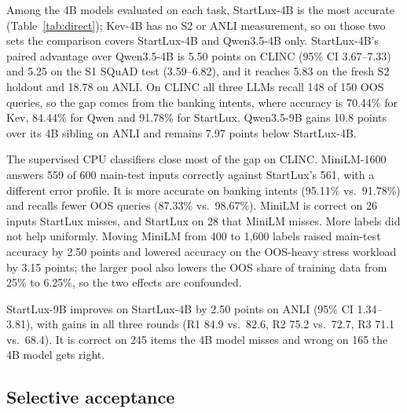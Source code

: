 \documentclass[11pt]{article}
\begin{document}
Among the 4B models evaluated on each task, StartLux-4B is the most accurate (Table~\ref{tab:direct}); Kev-4B has no S2 or ANLI measurement, so on those two sets the comparison covers StartLux-4B and Qwen3.5-4B only. StartLux-4B's paired advantage over Qwen3.5-4B is 5.50 points on CLINC (95\% CI 3.67--7.33) and 5.25 on the S1 SQuAD test (3.59--6.82), and it reaches 5.83 on the fresh S2 holdout and 18.78 on ANLI. On CLINC all three LLMs recall 148 of 150 OOS queries, so the gap comes from the banking intents, where accuracy is 70.44\% for Kev, 84.44\% for Qwen and 91.78\% for StartLux. Qwen3.5-9B gains 10.8 points over its 4B sibling on ANLI and remains 7.97 points below StartLux-4B.

The supervised CPU classifiers close most of the gap on CLINC. MiniLM-1600 answers 559 of 600 main-test inputs correctly against StartLux's 561, with a different error profile. It is more accurate on banking intents (95.11\% vs.\ 91.78\%) and recalls fewer OOS queries (87.33\% vs.\ 98.67\%). MiniLM is correct on 26 inputs StartLux misses, and StartLux on 28 that MiniLM misses. More labels did not help uniformly. Moving MiniLM from 400 to 1,600 labels raised main-test accuracy by 2.50 points and lowered accuracy on the OOS-heavy stress workload by 3.15 points; the larger pool also lowers the OOS share of training data from 25\% to 6.25\%, so the two effects are confounded.

StartLux-9B improves on StartLux-4B by 2.50 points on ANLI (95\% CI 1.34--3.81), with gains in all three rounds (R1 84.9 vs.\ 82.6, R2 75.2 vs.\ 72.7, R3 71.1 vs.\ 68.4). It is correct on 245 items the 4B model misses and wrong on 165 the 4B model gets right.

\subsection{Selective acceptance}

\begin{table}[t]
\centering
\small
\setlength{\tabcolsep}{3pt}
\caption{Primary endpoint of Study~1: test coverage (\%) and selective risk (\% error among accepted inputs) at thresholds frozen on validation with a 5\% target, with 95\% paired percentile bootstrap intervals (CLINC resampled within class strata, SQuAD by article). Released (rel.) and refitted temperatures give identical gates except for Kev on CLINC.}
\label{tab:risk}
\end{table}
\end{document}
